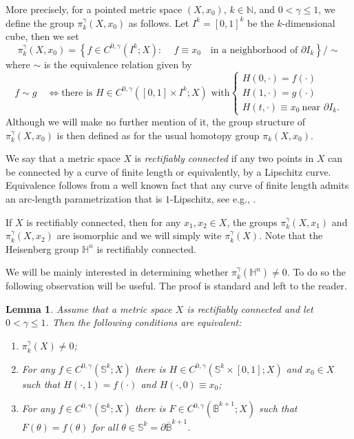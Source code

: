 \documentclass[intlimits,12pt,reqno]{amsart}
\newcommand{\Sph}{\mathbb S}
\newcommand{\bbbb}{\mathbb B}
\newcommand{\bbbn}{\mathbb N}
\newcommand{\bbbh}{\mathbb H}
\numberwithin{equation}{section}
\newtheorem{lemma}[theorem]{Lemma}
\theoremstyle{definition}
\begin{document}
More precisely, for a pointed metric space $(X,x_0)$, $k\in\bbbn$, and $0<\gamma\leq 1$, we define the group $\pi_k^\gamma(X,x_0)$ as follows. Let $I^k = [0,1]^k$ be the $k$-dimensional cube, then we set 
\[
\pi_k^\gamma(X,x_0) = \left \{f \in C^{0,\gamma}(I^k; X):\, \quad f \equiv x_0 \quad \mbox{in a neighborhood of $\partial I_k$} \right \}/ \sim
\]
where $\sim$ is the equivalence relation given by
\[
f \sim g \quad \Longleftrightarrow \mbox{there is $H \in C^{0,\gamma}([0,1] \times I^k; X)$ with} 
\begin{cases} 
H(0,\cdot) = f(\cdot)\\
H(1,\cdot) = g(\cdot)\\
H(t,\cdot) \equiv x_0\ \mbox{near $\partial I_k$.}
\end{cases}
\]
Although we will make no further mention of it, the group structure of $\pi_k^\gamma(X,x_0)$ is then defined as for the usual homotopy group $\pi_k(X,x_0)$. 

We say that a metric space $X$ is {\em rectifiably connected} if any two points in $X$ can be connected by a curve of finite length or equivalently, by a Lipschitz curve. 
Equivalence follows from a well known fact that any curve of finite length admits an arc-length parametrization that is $1$-Lipschitz, see e.g., \cite[Theorem~3.2]{Haj2003}.

If $X$ is rectifiably connected, then for any $x_1,x_2\in X$, the groups $\pi_k^\gamma(X,x_1)$ and $\pi_k^\gamma(X,x_2)$ are isomorphic and we will simply wite $\pi_k^\gamma(X)$. Note that the Heisenberg group $\bbbh^n$ is rectifiably connected.

We will be mainly interested in determining whether $\pi_k^\gamma(\bbbh^n)\neq 0$. To do so the following observation will be useful. The proof is standard and left to the reader.
\begin{lemma}
\label{T105}
Assume that a metric space $X$ is rectifiably connected and let $0<\gamma\leq 1$. Then the following conditions are equivalent:
\begin{enumerate}
\item $\pi_k^\gamma(X)\neq 0$;
\item For any $f\in C^{0,\gamma}(\Sph^k;X)$ there is $H\in C^{0,\gamma}(\Sph^k\times [0,1];X)$ and $x_0\in X$ such that $H(\cdot,1)=f(\cdot)$ and $H(\cdot,0)\equiv x_0$;
\item For any $f\in C^{0,\gamma}(\Sph^k;X)$ there is $F\in C^{0,\gamma}(\overline{\bbbb}^{k+1};X)$ such that $F(\theta)=f(\theta)$ for all $\theta\in\Sph^k=\partial\overline{\bbbb}^{k+1}$.
\end{enumerate}
\end{lemma}
\end{document}
